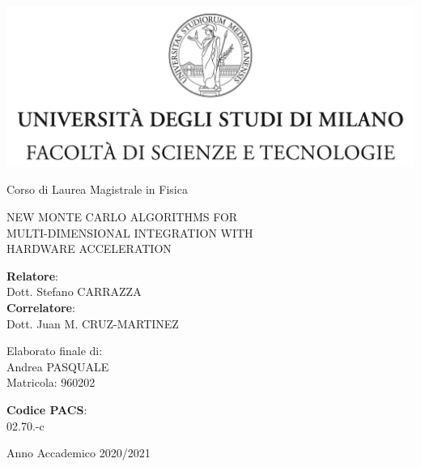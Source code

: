 \documentclass[12pt]{report}
\begin{document}
	
\thispagestyle{empty}

\begin{center}
\includegraphics{../images/tesiSCIENZE_TECNOLOGIE.jpg}
\end{center}
\begin{center}
	{\LARGE Corso di Laurea Magistrale in Fisica}
\end{center}
\begin{center}
	\vspace{2cm}
	{\Large NEW MONTE CARLO ALGORITHMS  FOR\\MULTI-DIMENSIONAL  INTEGRATION  WITH\\HARDWARE ACCELERATION \\} 
\end{center}
\par
\vspace{1 cm}
\begin{flushleft}  		 
	\textbf{Relatore}:\\ {Dott. Stefano CARRAZZA}\\
	\textbf{Correlatore}:\\ {Dott. Juan M. CRUZ-MARTINEZ}\\
\end{flushleft}
\vspace{1 cm}
\begin{flushright}
	Elaborato finale di:\\ Andrea PASQUALE\\ Matricola: 960202\\
\end{flushright}
\begin{flushright}
	\textbf{Codice PACS}: \\ 02.70.-c
\end{flushright}
\vfill
\begin{center}
	{\large Anno Accademico 2020/2021}
\end{center}


\setcounter{page}{1}

\tableofcontents







\setcounter{page}{1}




\nocite{*}

\appendix

\printbibliography
\end{document}
